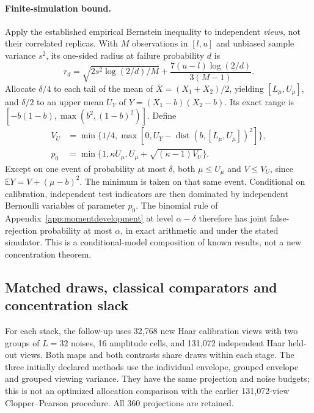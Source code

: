 \paragraph{Finite-simulation bound.}
Apply the established empirical Bernstein inequality to independent \emph{views},
not their correlated replicas. With $M$ observations in $[l,u]$ and unbiased
sample variance $s^2$, its one-sided radius at failure probability $d$ is
\[
 r_d=\sqrt{2s^2\log(2/d)/M}
       +\frac{7(u-l)\log(2/d)}{3(M-1)}.
\]
Allocate $\delta/4$ to each tail of the mean of
$\overline X=(X_1+X_2)/2$, yielding $[L_\mu,U_\mu]$, and $\delta/2$ to an
upper mean $U_Y$ of $Y=(X_1-b)(X_2-b)$. Its exact range is
$[-b(1-b),\max(b^2,(1-b)^2)]$. Define
\begin{align*}
 V_U&=\min\{1/4,\max[0,U_Y-\operatorname{dist}(b,[L_\mu,U_\mu])^2]\},\\
 p_0&=\min\{1,\kappa U_\mu,U_\mu+\sqrt{(\kappa-1)V_U}\}.
\end{align*}
Except on one event of probability at most $\delta$, both $\mu\le U_\mu$
and $V\le V_U$, since $\mathbb E Y=V+(\mu-b)^2$. The minimum is taken
on that same event. Conditional on calibration, independent test indicators
are then dominated by independent Bernoulli variables of parameter $p_0$.
The binomial rule of Appendix~\ref{app:momentdevelopment} at level
$\alpha-\delta$ therefore has joint false-rejection probability at most
$\alpha$, in exact arithmetic and under the stated simulator. This is a
conditional-model composition of known results, not a new concentration theorem.

\subsection{Matched draws, classical comparators and concentration slack}
For each stack, the follow-up uses 32,768 new Haar calibration views with two
groups of $L=32$ noises, 16 amplitude cells, and 131,072 independent Haar
held-out views. Both maps and both contrasts share draws within each stage.
The three initially declared methods use the individual envelope, grouped
envelope and grouped viewing variance. They have the same projection and noise
budgets; this is not an optimized allocation comparison with the earlier
131,072-view Clopper--Pearson procedure. All 360 projections are retained.

